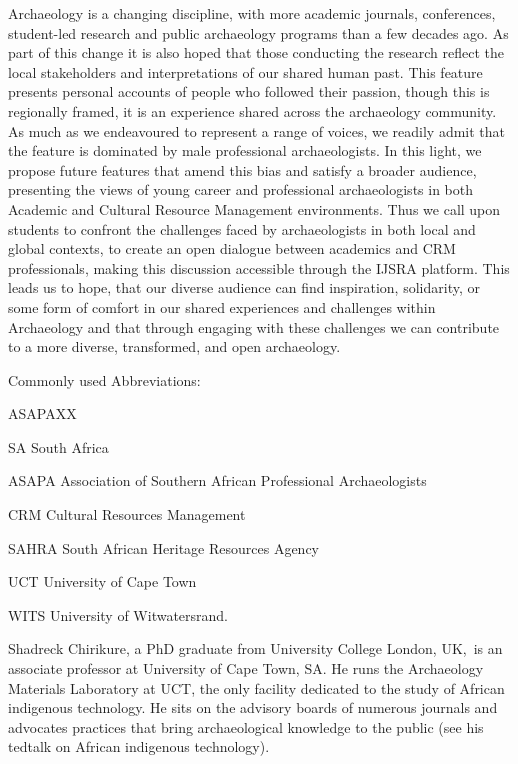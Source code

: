 \documentclass[%
	]{ijsra}
\begin{document}
Archaeology is a changing discipline, with more academic journals, conferences, student-led research and public archaeology programs than a few decades ago. As part of this change it is also hoped that those conducting the research reflect the local stakeholders and interpretations of our shared human past. This feature presents personal accounts of people who followed their passion, though this is regionally framed, it is an experience shared across the archaeology community. As much as we endeavoured to represent a range of voices, we readily admit that the feature is dominated by male professional archaeologists. In this light, we propose future features that amend this bias and satisfy a broader audience, presenting the views of young career and professional archaeologists in both Academic and Cultural Resource Management environments. Thus we call upon students to confront the challenges faced by archaeologists in both local and global contexts, to create an open dialogue between academics and CRM professionals, making this discussion accessible through the IJSRA platform. This leads us to hope, that our diverse audience can find inspiration, solidarity, or some form of comfort in our shared experiences and challenges within Archaeology and that through engaging with these challenges we can contribute to a more diverse, transformed, and open archaeology.

\bigskip
{}
Commonly used Abbreviations:
\begin{labeling}{ASAPAXX}	
\item[SA] South Africa 
\item[ASAPA] Association of Southern African Professional Archaeologists
\item[CRM] Cultural Resources Management
\item[SAHRA] South African Heritage Resources Agency
\item[UCT] University of Cape Town 
\item[WITS] University of Witwatersrand.
\end{labeling}

\IJSRAseparator
{}
{\sffamily Shadreck Chirikure, a PhD graduate from University College London, UK, is an associate professor at University of Cape Town, SA. He runs the Archaeology Materials Laboratory at UCT, the only facility dedicated to the study of African indigenous technology. He sits on the advisory boards of numerous journals and advocates practices that bring archaeological knowledge to the public (see his tedtalk on African indigenous technology).}
\end{document}
